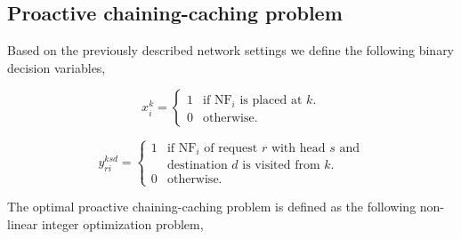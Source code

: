 \documentclass[journal]{IEEEtran}
\begin{document}
\subsection{Proactive chaining-caching problem}
Based on the previously described network settings we define the following binary decision variables,

\begin{equation}
  x_{i} ^{k} = \left \{
  \begin{array}{rl}
    1 & \text{if NF$_{i }$ is placed at $k$}. \\
    0 & \text{otherwise}.
  \end{array} \right.
\end{equation}

\begin{equation}
  y_{ri} ^{ksd} = \left \{
  \begin{array}{rl}
    1 & \text{if NF$_{i}$ of request $r$ with head $s$ and} \\
    &\text{destination $d$ is visited from $k$}. \\
    0 & \text{otherwise}.
  \end{array} \right.
\end{equation}

The optimal proactive chaining-caching problem is defined as the following non-linear integer optimization problem,
\end{document}
